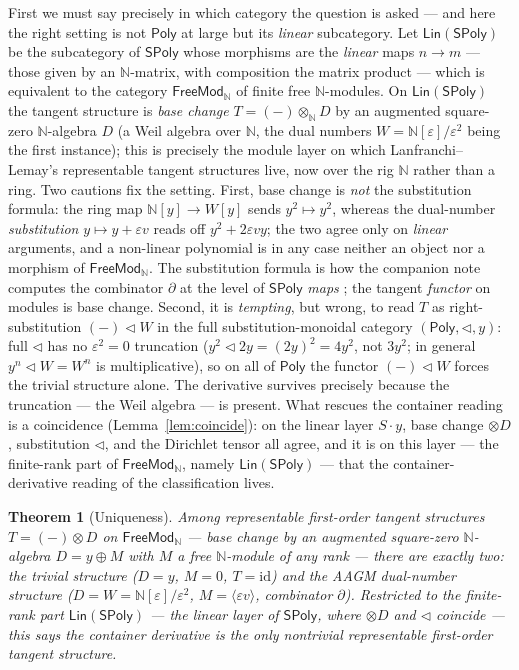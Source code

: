 \documentclass[11pt]{article}
\newtheorem{theorem}{Theorem}
\theoremstyle{definition}
\newcommand{\SPoly}{\mathsf{SPoly}}
\newcommand{\Lin}{\mathsf{Lin}}
\newcommand{\FreeMod}{\mathsf{FreeMod}}
\newcommand{\Poly}{\mathsf{Poly}}
\newcommand{\N}{\mathbb{N}}
\newcommand{\id}{\mathrm{id}}
\begin{document}
First we must say precisely in which category the question is asked --- and here the right setting
is not $\Poly$ at large but its \emph{linear} subcategory. Let $\Lin(\SPoly)$ be the subcategory of
$\SPoly$ whose morphisms are the \emph{linear} maps $n\to m$ --- those given by an $\N$-matrix, with
composition the matrix product --- which is equivalent to the category $\FreeMod_\N$ of finite free
$\N$-modules. On $\Lin(\SPoly)$ the tangent structure is \emph{base change} $T=(-)\otimes_\N D$ by an
augmented square-zero $\N$-algebra $D$ (a Weil algebra over $\N$, the dual numbers
$W=\N[\varepsilon]/\varepsilon^2$ being the first instance); this is precisely the module layer on
which Lanfranchi--Lemay's representable tangent structures live, now over the rig $\N$ rather than a
ring. Two cautions fix the setting. First, base change is \emph{not} the substitution formula: the
ring map $\N[y]\to W[y]$ sends $y^2\mapsto y^2$, whereas the dual-number \emph{substitution}
$y\mapsto y+\varepsilon v$ reads off $y^2+2\varepsilon vy$; the two agree only on \emph{linear}
arguments, and a non-linear polynomial is in any case neither an object nor a morphism of
$\FreeMod_\N$. The substitution formula is how the companion note computes the combinator $\partial$
at the level of $\SPoly$ \emph{maps} \cite{MacBethTangent}; the tangent \emph{functor} on modules is
base change. Second, it is \emph{tempting}, but wrong, to read $T$ as right-substitution $(-)\lhd W$
in the full substitution-monoidal category $(\Poly,\lhd,y)$: full $\lhd$ has no $\varepsilon^2=0$
truncation ($y^2\lhd 2y=(2y)^2=4y^2$, not $3y^2$; in general $y^n\lhd W=W^n$ is multiplicative), so on
all of $\Poly$ the functor $(-)\lhd W$ forces the trivial structure alone. The derivative survives
precisely because the truncation --- the Weil algebra --- is present. What rescues the container
reading is a coincidence (Lemma~\ref{lem:coincide}): on the linear layer $S\cdot y$, base change
$\otimes D$, substitution $\lhd$, and the Dirichlet tensor all agree, and it is on this layer ---
the finite-rank part of $\FreeMod_\N$, namely $\Lin(\SPoly)$ --- that the container-derivative reading
of the classification lives.

\begin{theorem}[Uniqueness]\label{thm:main-intro}
Among representable first-order tangent structures $T=(-)\otimes D$ on $\FreeMod_\N$ --- base change
by an augmented square-zero $\N$-algebra $D=y\oplus M$ with $M$ a free $\N$-module of \emph{any} rank
--- there are exactly two: the trivial structure ($D=y$, $M=0$, $T=\id$) and the AAGM dual-number
structure ($D=W=\N[\varepsilon]/\varepsilon^2$, $M=\langle\varepsilon v\rangle$, combinator
$\partial$). Restricted to the finite-rank part $\Lin(\SPoly)$ --- the linear layer of $\SPoly$,
where $\otimes D$ and $\lhd$ coincide --- this says the container derivative is the only nontrivial
representable first-order tangent structure.
\end{theorem}
\end{document}
